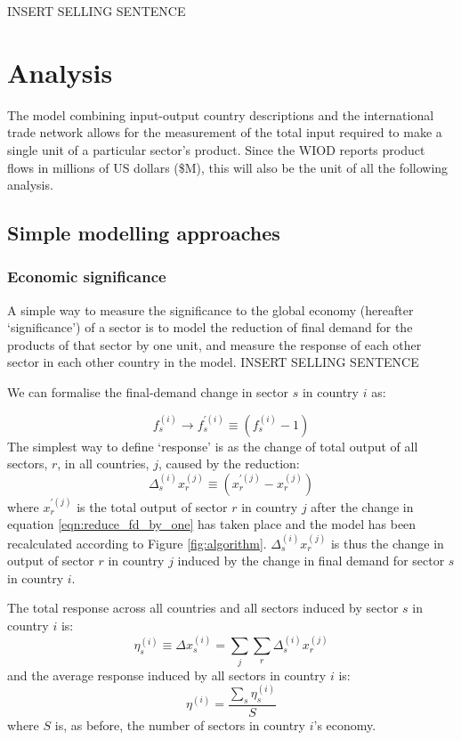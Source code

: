 \documentclass[a4paper]{article}
\begin{document}
INSERT SELLING SENTENCE

\section{Analysis}\label{sec:analysis}
The model combining input-output country descriptions and the international trade network allows for the measurement of the total input required to make a single unit of a particular sector's product.
Since the WIOD reports product flows in millions of US dollars (\$M), this will also be the unit of all the following analysis.

\subsection{Simple modelling approaches}
\label{ss_simple_modelling_approaches}

\subsubsection*{Economic significance}
A simple way to measure the significance to the global economy (hereafter `significance') of a sector is to model the reduction of final demand for the products of that sector by one unit, and measure the response of each other sector in each other country in the model. INSERT SELLING SENTENCE

We can formalise the final-demand change in sector $s$ in country $i$ as:

\begin{equation}\label{eqn:reduce_fd_by_one}
f_s^{(i)} \rightarrow f_s^{\prime (i)} \equiv (f_s^{(i)} - 1)
\end{equation}
The simplest way to define `response' is as the change of total output of all sectors, $r$, in all countries, $j$, caused by the reduction:
\begin{equation}
\Delta_{s}^{(i)} x_{r}^{(j)} \equiv (x_{r}^{\prime(j)} - x_r^{(j)})
\end{equation}
where $x_{r}^{\prime(j)}$ is the total output of sector $r$ in country $j$ after the change in equation \eqref{eqn:reduce_fd_by_one} has taken place and the model has been recalculated according to Figure \ref{fig:algorithm}.
$\Delta_{s}^{(i)} x_{r}^{(j)}$ is thus the change in output of sector $r$ in country $j$ induced by the change in final demand for sector $s$ in country $i$.

The total response across all countries and all sectors induced by sector $s$ in country $i$ is:
\begin{equation}
\eta_s^{(i)} \equiv \Delta x_{s}^{(i)} = \sum_j \sum_r \Delta_{s}^{(i)} x_{r}^{(j)}
\end{equation}
and the average response induced by all sectors in country $i$ is:
\begin{equation}
\eta^{(i)} = \frac{\sum_s \eta_s^{(i)}}{S}
\end{equation}
where $S$ is, as before, the number of sectors in country $i$'s economy.
\end{document}
